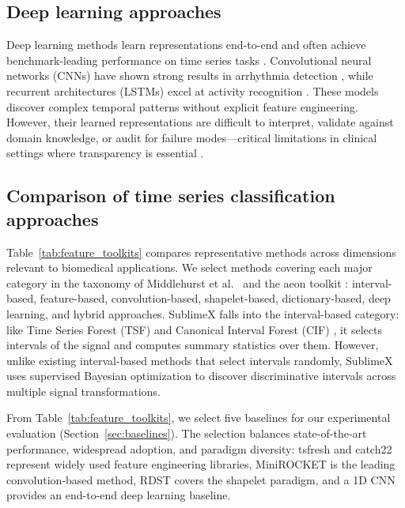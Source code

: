 \documentclass[times, review, 10pt]{elsarticle}
\begin{document}
\subsection{Deep learning approaches}
Deep learning methods learn representations end-to-end and often achieve benchmark-leading performance on time series tasks \cite{miotto2018deep, morid2023time}. Convolutional neural
networks (CNNs) have shown strong results in arrhythmia detection \cite{acharya2017ecg_deep, hannun2019cardiologist}, while recurrent architectures (LSTMs) excel at activity recognition
\cite{ordonez2016deep_activity, hammerla2016deep_activity}. 
These models discover complex temporal patterns without explicit feature engineering. However, their learned representations are difficult to interpret, 
validate against domain knowledge, or audit for failure modes---critical limitations in clinical settings where transparency is essential \cite{rudin2019stop, tonekaboni2019clinicians, wang2022systematic}.

\subsection{Comparison of time series classification approaches}
Table~\ref{tab:feature_toolkits} compares representative methods
across dimensions relevant to biomedical applications. We
select methods covering each major category in the taxonomy of
Middlehurst et al.\ \cite{middlehurst2024bakeoff} and the aeon toolkit \cite{middlehurst2024aeon}: interval-based,
feature-based, convolution-based, shapelet-based, dictionary-based,
deep learning, and hybrid approaches. SublimeX falls into the
interval-based category: like Time Series Forest (TSF)
\cite{deng2013tsf} and Canonical Interval Forest (CIF)
\cite{middlehurst2020cif}, it selects intervals of the signal and
computes summary statistics over them. However, unlike existing
interval-based methods that select intervals randomly, SublimeX
uses supervised Bayesian optimization to discover discriminative
intervals across multiple signal transformations.

From Table~\ref{tab:feature_toolkits}, we
select five baselines for our experimental evaluation
(Section~\ref{sec:baselines}). The selection balances
state-of-the-art performance, widespread adoption, and paradigm
diversity: tsfresh and catch22 represent widely used feature
engineering libraries, MiniROCKET is the leading convolution-based
method, RDST covers the shapelet paradigm, and a 1D CNN provides
an end-to-end deep learning baseline.
\end{document}
